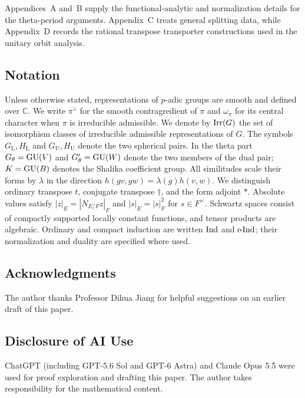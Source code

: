 Appendices~A and~B supply the functional-analytic and normalization
details for the theta-period arguments. Appendix~C treats general
splitting data, while Appendix~D records the rational transpose
transporter constructions used in the unitary orbit analysis.

\subsection{Notation}
Unless otherwise stated, representations of $p$-adic groups
are smooth and defined over $\mathbb C$.
We write $\pi^\vee$ for the smooth contragredient of $\pi$
and $\omega_\pi$ for its central character when $\pi$
is irreducible admissible.
We denote by $\operatorname{Irr}(G)$ the set of isomorphism classes
of irreducible admissible representations of $G$. The symbols $G_{\mathrm L},H_{\mathrm L}$ and
$G_{\mathrm U},H_{\mathrm U}$ denote the two spherical pairs.
In the theta part $G_\theta=\operatorname{GU}(V)$ and
$G'_\theta=\operatorname{GU}(W)$ denote the two members of the dual pair;
$K=\operatorname{GU}(B)$ denotes the Shalika coefficient group.
All similitudes scale their forms by $\lambda$ in the direction
$h(gv,gw)=\lambda(g)h(v,w)$. We distinguish ordinary transpose $t$, conjugate
transpose $\dagger$, and the form adjoint $*$.
Absolute values satisfy $|z|_E=|N_{E/F}z|_F$ and
$|s|_E=|s|_F^2$ for $s\in F^\times$.
Schwartz spaces consist of compactly supported locally constant
functions, and tensor products are algebraic. Ordinary and compact induction are written
$\operatorname{Ind}$ and $\operatorname{c\!-Ind}$; their normalization and duality are specified
where used.

\subsection*{Acknowledgments}
The author thanks Professor Dihua Jiang for helpful suggestions on an earlier
draft of this paper.

\subsection*{Disclosure of AI Use}
ChatGPT (including GPT-5.6 Sol and GPT-6 Astra) and Claude Opus 5.5 were used for proof exploration and drafting this
paper. The author takes responsibility for the
mathematical content.